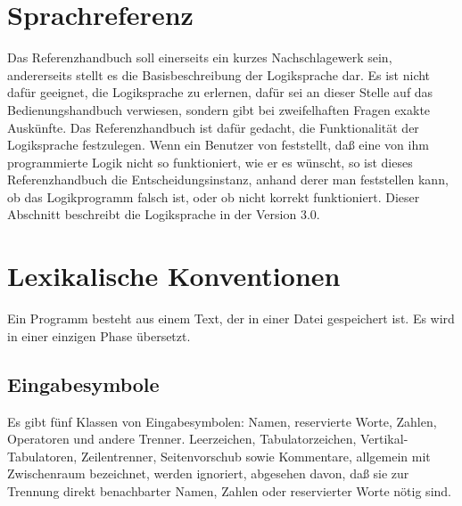 
\newcommand{\bi}{\begin{itemize}}
\newcommand{\ei}{\end{itemize}}


\pagestyle{headings}

\chapter{Sprachreferenz\label{cha:sprachreferenz}}
\label{eins}

Das Referenzhandbuch soll einerseits ein kurzes
Nachschlagewerk sein, andererseits stellt es die Basisbeschreibung
der Logiksprache \mutabor{} dar. Es ist nicht dafür geeignet, die
Logiksprache zu erlernen, dafür sei an dieser Stelle auf das
Bedienungshandbuch verwiesen, sondern gibt bei zweifelhaften
Fragen exakte Auskünfte. Das Referenzhandbuch ist dafür gedacht,
die Funktionalität der Logiksprache festzulegen. Wenn ein Benutzer
von \mutabor{} feststellt, daß eine von ihm programmierte Logik
nicht so funktioniert, wie er es wünscht, so ist dieses
Referenzhandbuch die Entscheidungsinstanz, anhand derer man
feststellen kann, ob das Logikprogramm falsch ist, oder ob
\mutabor{} nicht korrekt funktioniert.
Dieser Abschnitt beschreibt die Logiksprache \mutabor{} in der Version 3.0.


\chapter{Lexikalische Konventionen}\label{cha:lexik-konv}
\label{zwei}

Ein Programm besteht aus einem Text, der in einer Datei gespeichert ist.
Es wird in einer einzigen Phase übersetzt.

\section{Eingabesymbole}\label{sec:eingabesymbole}
\label{zweieins}

Es  gibt fünf Klassen von Eingabesymbolen:
Namen,  reservierte  Worte,
Zahlen,
 Operatoren  und  andere
Trenner.  Leerzeichen, Tabulatorzeichen,
Vertikal-Tabulatoren,
Zeilentrenner, Seitenvorschub
sowie Kommentare,
allgemein mit Zwischenraum  bezeichnet,  werden
ignoriert,  abgesehen davon,  daß sie zur Trennung direkt
benachbarter Namen, Zahlen oder reservierter Worte nötig sind.

